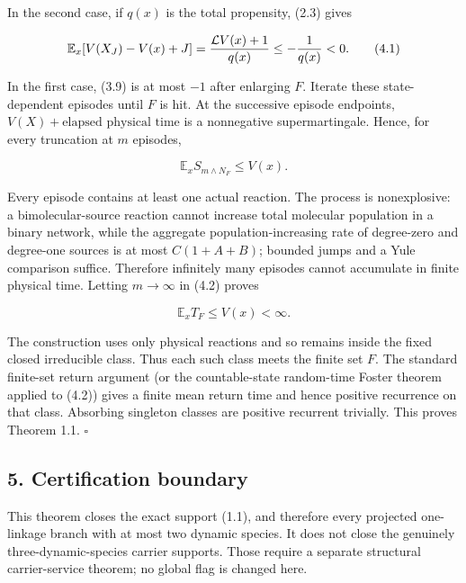 In the second case, if \(q(x)\) is the total propensity, (2.3) gives

\[
 \mathbb E_x[V(X_J)-V(x)+J]
 ={\mathcal LV(x)+1\over q(x)}\le-{1\over q(x)}<0.              \tag{4.1}
\]

In the first case, (3.9) is at most \(-1\) after enlarging \(F\).
Iterate these state-dependent episodes until \(F\) is hit. At the
successive episode endpoints, \(V(X)+\text{elapsed physical time}\) is a
nonnegative supermartingale. Hence, for every truncation at \(m\)
episodes,

\[
             \mathbb E_x S_{m\wedge N_F}\le V(x).               \tag{4.2}
\]

Every episode contains at least one actual reaction. The process is
nonexplosive: a bimolecular-source reaction cannot increase total
molecular population in a binary network, while the aggregate
population-increasing rate of degree-zero and degree-one sources is at
most \(C(1+A+B)\); bounded jumps and a Yule comparison suffice.
Therefore infinitely many episodes cannot accumulate in finite physical
time. Letting \(m\to\infty\) in (4.2) proves

\[
                       \mathbb E_x T_F\le V(x)<\infty.           \tag{4.3}
\]

The construction uses only physical reactions and so remains inside the
fixed closed irreducible class. Thus each such class meets the finite
set \(F\). The standard finite-set return argument (or the
countable-state random-time Foster theorem applied to (4.2)) gives a
finite mean return time and hence positive recurrence on that class.
Absorbing singleton classes are positive recurrent trivially. This
proves Theorem 1.1. \(\square\)

\subsection{5. Certification boundary}

This theorem closes the exact support (1.1), and therefore every
projected one-linkage branch with at most two dynamic species. It does
not close the genuinely three-dynamic-species carrier supports. Those
require a separate structural carrier-service theorem; no global flag is
changed here.
